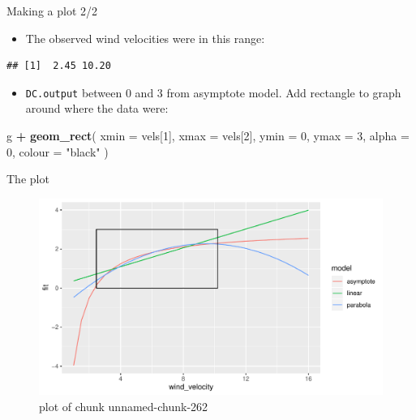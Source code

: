 \documentclass[ignorenonframetext,]{beamer}
\newenvironment{Shaded}{\begin{snugshade}}{\end{snugshade}}
\newcommand{\DataTypeTok}[1]{\textcolor[rgb]{0.13,0.29,0.53}{#1}}
\newcommand{\DecValTok}[1]{\textcolor[rgb]{0.00,0.00,0.81}{#1}}
\newcommand{\KeywordTok}[1]{\textcolor[rgb]{0.13,0.29,0.53}{\textbf{#1}}}
\newcommand{\NormalTok}[1]{#1}
\newcommand{\OperatorTok}[1]{\textcolor[rgb]{0.81,0.36,0.00}{\textbf{#1}}}
\newcommand{\StringTok}[1]{\textcolor[rgb]{0.31,0.60,0.02}{#1}}
\providecommand{\tightlist}{%
  \setlength{\itemsep}{0pt}\setlength{\parskip}{0pt}}
\begin{document}
\begin{frame}[fragile]{Making a plot 2/2}
\protect\hypertarget{making-a-plot-22}{}

\begin{itemize}
\tightlist
\item
  The observed wind velocities were in this range:
\end{itemize}

\begin{Shaded}
\end{Shaded}

\begin{verbatim}
## [1]  2.45 10.20
\end{verbatim}

\begin{itemize}
\tightlist
\item
  \texttt{DC.output} between 0 and 3 from asymptote model. Add rectangle
  to graph around where the data were:
\end{itemize}

\begin{Shaded}
\begin{Highlighting}[]
\NormalTok{g }\OperatorTok{+}\StringTok{ }\KeywordTok{geom_rect}\NormalTok{(}
  \DataTypeTok{xmin =}\NormalTok{ vels[}\DecValTok{1}\NormalTok{], }\DataTypeTok{xmax =}\NormalTok{ vels[}\DecValTok{2}\NormalTok{], }\DataTypeTok{ymin =} \DecValTok{0}\NormalTok{, }\DataTypeTok{ymax =} \DecValTok{3}\NormalTok{,}
  \DataTypeTok{alpha =} \DecValTok{0}\NormalTok{, }\DataTypeTok{colour =} \StringTok{"black"}
\NormalTok{)}
\end{Highlighting}
\end{Shaded}

\end{frame}

\begin{frame}{The plot}
\protect\hypertarget{the-plot-1}{}

\begin{figure}
\centering
\includegraphics{figure/unnamed-chunk-262-1.pdf}
\caption{plot of chunk unnamed-chunk-262}
\end{figure}

\end{frame}
\end{document}
